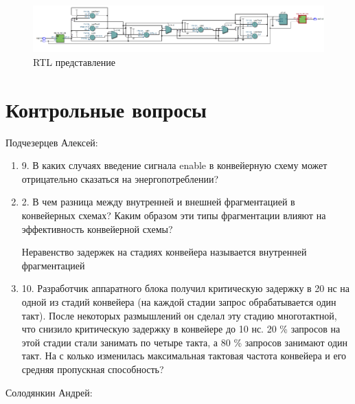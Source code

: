 \documentclass[a4paper,14pt]{article}
\begin{document}
	\begin{figure}[H]
		\centering
		\includegraphics[width=\linewidth]{images/dop_rtl}
		\caption{RTL представление}
		\label{fig:dop_rtl}
	\end{figure}

	\section{Контрольные вопросы}
	
	Подчезерцев Алексей:
	
	\begin{enumerate}
		\item 9. В каких случаях введение сигнала enable в конвейерную схему может отрицательно сказаться на энергопотреблении? 
	
		\item 2. В чем разница между внутренней и внешней фрагментацией в конвейерных схемах?
		Каким образом эти типы фрагментации влияют на эффективность конвейерной	схемы?
		
		Неравенство задержек на стадиях конвейера называется внутренней фрагментацией

		\item 10. Разработчик аппаратного блока получил критическую задержку в 20 нс на одной из стадий конвейера (на каждой стадии запрос обрабатывается один такт). После некоторых размышлений он сделал эту стадию многотактной, что снизило критическую задержку в конвейере до 10 нс. 20 \% запросов на этой стадии стали занимать по четыре такта, а 80 \% запросов занимают один такт. На с колько	изменилась максимальная тактовая частота конвейера и его средняя пропускная способность?

	\end{enumerate}
	
	Солодянкин Андрей:
\end{document}
